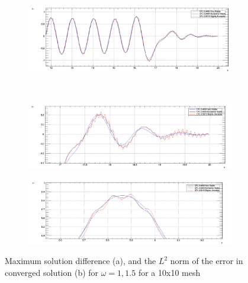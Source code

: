 \documentclass[paper=a4, fontsize=11pt, abstract=on]{scrartcl}
\numberwithin{equation}{section}		%
\numberwithin{figure}{section}			%
\numberwithin{table}{section}				%
\begin{document}
\begin{figure}[H]
        \centering
        \begin{subfigure}[h]{\textwidth}
                \includegraphics[width = 14.95cm]{stab1}
                \caption{}
				
        \end{subfigure}%
       ~~~~~
       
        \begin{subfigure}[h]{\textwidth}
                \includegraphics[width = 15.15cm]{stab3}
                \caption{}
                
        \end{subfigure}
        
        
        \begin{subfigure}[h]{\textwidth}
                \includegraphics[width = 15.35cm]{stab2}
                \caption{}
                
        \end{subfigure}
        \caption{Maximum solution difference (a), and the $L^2$ norm of the error in converged solution (b) for $\omega = 1, 1.5$ for a 10x10 mesh }
        \label{q34}
\end{figure}
\end{document}
